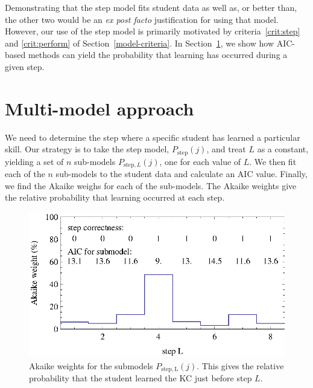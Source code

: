 \documentclass{acmlarge-edm}
\begin{document}
Demonstrating that the step model fits student data as well as,
or better than, the other two would be an
{\em ex post facto} justification for using that model.  
However, our use of the step model is primarily motivated
by criteria~\ref{crit:step} and \ref{crit:perform} of 
Section~\ref{model-criteria}.
In Section~\ref{multi-model}, we show how AIC-based methods
can yield the probability that learning has occurred during a given step.

\section{Multi-model approach}
\label{multi-model}

We need to determine the step where a specific student has learned a
particular skill.  Our strategy is to take the step model, 
$P_\mathrm{step}(j)$, and treat $L$ as a constant, yielding a set of $n$ 
sub-models $P_{\mathrm{step},L}(j)$, one for each value of $L$.
We then fit each of the $n$ sub-models to the student data and
calculate an AIC value.  Finally, we find the Akaike weighs for each of the
sub-models.  The Akaike weights give the relative probability that learning
occurred at each step.

\begin{figure}
  \centering \includegraphics{step-weights.eps}
   \caption{Akaike weights for the submodels $P_\mathrm{step,L}(j)$.  
     This gives the relative probability that
      the student learned the KC just before step $L$.}
    \label{step-weights}
\end{figure}
\end{document}
